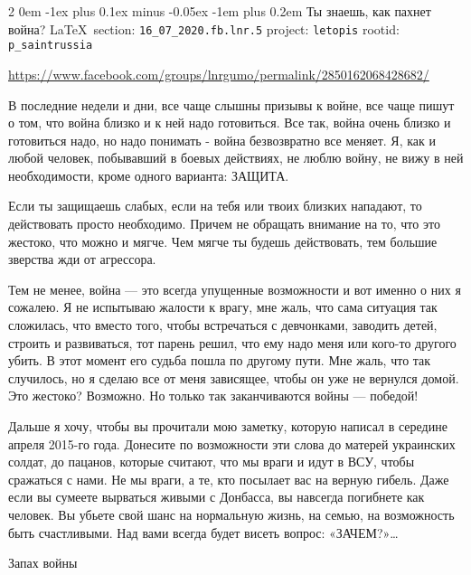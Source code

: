 \documentclass[a4paper,11pt]{extreport}
\makeatletter
\renewcommand\subsection{%
  \clearpage
    \@startsection{subsection}%
    {2}%
    {0em}%
    {-1ex plus 0.1ex minus -0.05ex}%
    {-1em plus 0.2em}%
    {\scshape\bfseries\Large}%
}
\makeatother
\begin{document}
 
  
\subsection{Ты знаешь, как пахнет война?}
\label{sec:16_07_2020.fb.lnr.5}
\vspace{0.5cm}
{\ifDEBUG\small\LaTeX~section: \verb|16_07_2020.fb.lnr.5| project: \verb|letopis| rootid: \verb|p_saintrussia|\fi}
\vspace{0.5cm}
  
\url{https://www.facebook.com/groups/lnrgumo/permalink/2850162068428682/}

В последние недели и дни, все чаще слышны призывы к войне, все чаще пишут о
том, что война близко и к ней надо готовиться. Все так, война очень близко и
готовиться надо, но надо понимать - война безвозвратно все меняет. Я, как и
любой человек, побывавший в боевых действиях, не люблю войну, не вижу в ней
необходимости, кроме одного варианта: ЗАЩИТА.

Если ты защищаешь слабых, если на тебя или твоих близких нападают, то
действовать просто необходимо. Причем не обращать внимание на то, что это
жестоко, что можно и мягче. Чем мягче ты будешь действовать, тем большие
зверства жди от агрессора.

Тем не менее, война --- это всегда упущенные возможности и вот именно о них я
сожалею. Я не испытываю жалости к врагу, мне жаль, что сама ситуация так
сложилась, что вместо того, чтобы встречаться с девчонками, заводить детей,
строить и развиваться, тот парень решил, что ему надо меня или кого-то другого
убить. В этот момент его судьба пошла по другому пути. Мне жаль, что так
случилось, но я сделаю все от меня зависящее, чтобы он уже не вернулся домой.
Это жестоко? Возможно. Но только так заканчиваются войны --- победой!

Дальше я хочу, чтобы вы прочитали мою заметку, которую написал в середине
апреля 2015-го года. Донесите по возможности эти слова до матерей украинских
солдат, до пацанов, которые считают, что мы враги и идут в ВСУ, чтобы сражаться
с нами. Не мы враги, а те, кто посылает вас на верную гибель. Даже если вы
сумеете вырваться живыми с Донбасса, вы навсегда погибнете как человек. Вы
убьете свой шанс на нормальную жизнь, на семью, на возможность быть
счастливыми. Над вами всегда будет висеть вопрос: «ЗАЧЕМ?»…

Запах войны
\end{document}
